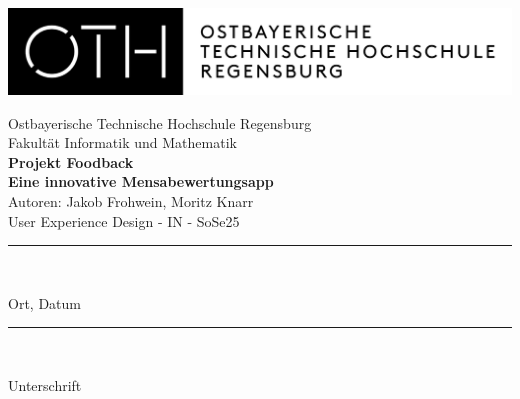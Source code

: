 \documentclass[12pt, a4paper]{scrreprt}
\begin{document}
\setlength{\parskip}{1em}
\begin{titlepage}
    \begin{center}
    	\includegraphics[width=\textwidth]{Bilder/logo_oth_Regensburg.png}
    \end{center}
    \vspace*{\baselineskip}
    \begin{center}
        {Ostbayerische Technische Hochschule Regensburg \\
    	Fakultät Informatik und Mathematik} \\
    	\vspace{2cm}
    	\Large \textbf{Projekt Foodback} \\
        \small \textbf{Eine innovative Mensabewertungsapp} \\
        \normalsize
        \vspace{2cm}
         Autoren: Jakob Frohwein, Moritz Knarr   \\
        \vspace{2cm}
        \vspace{0.5cm}
        User Experience Design - IN - SoSe25 \\
        \end{center}
     \vspace{7cm}
    \parbox{4cm}{%
    \rule{4cm}{1pt}\\
    \centerline{Ort, Datum}%
    }\hfill
       \parbox{5cm}{%
       \rule{5cm}{1pt}\\
    \centerline{Unterschrift}%
    }
\end{titlepage}

\vspace{2cm}



\tableofcontents
{}











\cleardoublepage
{}
\listoffigures


\printbibliography[heading=bibintoc,title={Quellenverzeichnis}]
\printbibliography[heading=subbibintoc,type=article,title={Articles only}]
\end{document}
